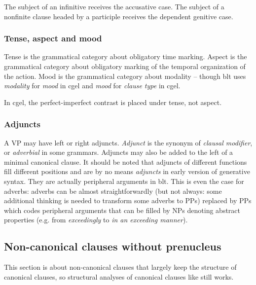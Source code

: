 \documentclass{article}
\newcommand*{\term}[1]{\emph{#1}}
\newcommand*{\corpus}[1]{\emph{#1}}
\begin{document}
The subject of an infinitive receives the accusative case.
The subject of a nonfinite clause headed by a participle 
receives the dependent genitive case.

\subsubsection{Tense, aspect and mood}\label{sec:tense-aspect}

Tense is the grammatical category about obligatory time marking.
Aspect is the grammatical category about obligatory marking of the temporal organization of the action.
Mood is the grammatical category about modality -- 
though \ac{blt} uses \term{modality} for \term{mood} in \ac{cgel} 
and \term{mood} for \term{clause type} in \ac{cgel}.

In \ac{cgel}, the perfect-imperfect contrast is placed under tense, not aspect.

\subsubsection{Adjuncts}\label{sec:adjunct}

A VP may have left or right adjuncts. 
\term{Adjunct} is the synonym of \term{clausal modifier},
or \term{adverbial} in some grammars.
Adjuncts may also be added to the left of a minimal canonical clause.
It should be noted that adjuncts of different functions fill different positions
and are by no means \term{adjuncts} in early version of generative syntax.
They are actually peripheral arguments in \ac{blt}.
This is even the case for adverbs: 
adverbs can be almost straightforwardly 
(but not always: some additional thinking is needed to transform some adverbs to PPs) 
replaced by PPs which codes peripheral arguments 
that can be filled by NPs denoting abstract properties
(e.g. from \corpus{exceedingly} to \corpus{in an exceeding manner}).

\subsection{Non-canonical clauses without prenucleus}\label{sec:in-clause-transformation}

This section is about non-canonical clauses that largely keep the structure of canonical clauses,
so structural analyses of canonical clauses like  still works. %
\end{document}
